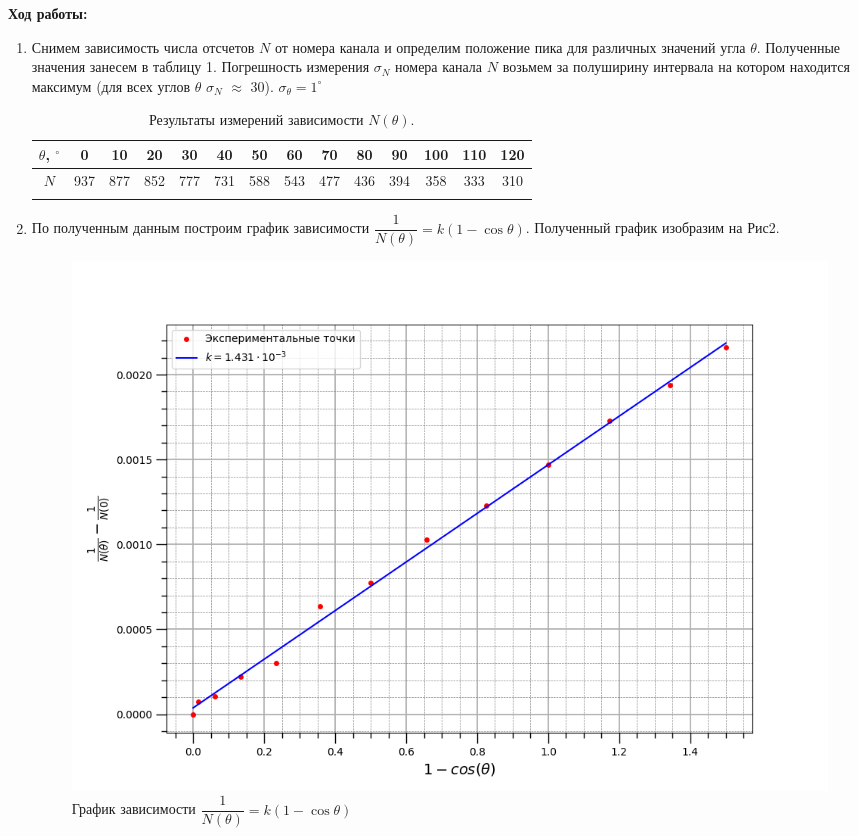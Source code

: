 \documentclass[a4paper, 12pt]{article}%
\begin{document}
	\newpage
	
	\textbf{Ход работы: }\\
	
	\begin{enumerate}
		
		\item Снимем зависимость числа отсчетов $N$ от номера канала и определим положение пика для различных значений угла $\theta$. Полученные значения занесем в таблицу 1. Погрешность измерения $\sigma_N$ номера канала $N$ возьмем за полуширину интервала на котором находится максимум (для всех углов $\theta$ $\sigma_N$ $\approx$ 30). $\sigma_{\theta} = 1^\circ$
		
		\begin{longtable}{|c|c|c|c|c|c|c|c|c|c|c|c|c|c|}
				\hline
				$\theta$, $^\circ$ & 0   & 10  & 20  & 30  & 40  & 50  & 60  & 70  & 80  & 90  & 100 & 110 & 120 \\ \hline
				$N$                & 937 & 877 & 852 & 777 & 731 & 588 & 543 & 477 & 436 & 394 & 358 & 333 & 310 \\ \hline
			\caption{Результаты измерений зависимости $N(\theta)$. }
		\end{longtable}
		
		
		\item По полученным данным построим график зависимости $\dfrac{1}{N(\theta)} = k(1-\cos \theta)$. Полученный график изобразим на Рис2.
		
		\begin{figure}[h]
			\begin{center}
				\includegraphics[width = 1.1\textwidth]{graph}
				\caption{График зависимости $\dfrac{1}{N(\theta)} = k(1-\cos \theta)$}
			\end{center}
		\end{figure}
		

\end{enumerate}
\end{document}
